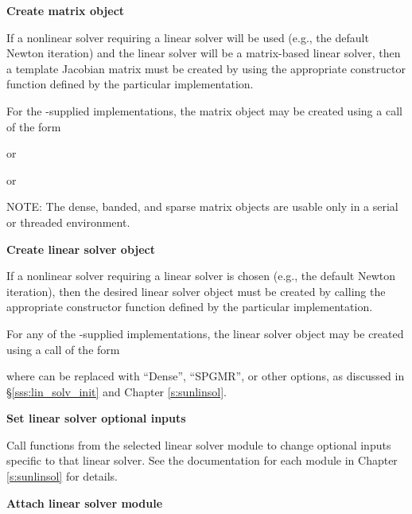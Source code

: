 \begin{Steps}
\item\label{i:matrix}
  {\bf Create matrix object}

  If a nonlinear solver requiring a linear solver will be used (e.g., the
  default Newton iteration) and the linear solver will be a matrix-based linear
  solver, then a template Jacobian matrix must be created by using the
  appropriate constructor function defined by the particular {\sunmatrix}
  implementation.

  For the {\sundials}-supplied {\sunmatrix} implementations, the
  matrix object may be created using a call of the form


   or


   or


  NOTE: The dense, banded, and sparse matrix objects are usable only in a
  serial or threaded environment.

\item\label{i:lin_solver}
  {\bf Create linear solver object}

  If a nonlinear solver requiring a linear solver is chosen (e.g., the default
  Newton iteration), then the desired linear solver object must be created by
  calling the appropriate constructor function defined by the particular
  {\sunlinsol} implementation.

  For any of the {\sundials}-supplied {\sunlinsol} implementations,
  the linear solver object may be created using a call of the form


  where \id{*} can be replaced with ``Dense'', ``SPGMR'', or other
  options, as discussed in \S\ref{sss:lin_solv_init} and Chapter {\ref{s:sunlinsol}}.

\item
  {\bf Set linear solver optional inputs}

  Call  functions from the selected linear solver module
  to change optional inputs specific to that linear solver.
  See the documentation for each {\sunlinsol} module in Chapter
  {\ref{s:sunlinsol}} for details.

\item\label{i:lin_solver_interface}
  {\bf Attach linear solver module}


\end{Steps}
